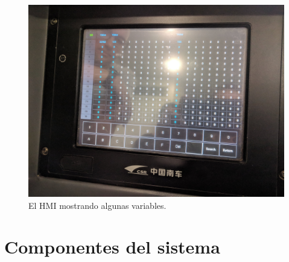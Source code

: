 \begin{figure}[htbp]
	\centering
	\includegraphics[width=1\textwidth]{./Figures/hmi.jpg}
	\caption[El HMI mostrando algunas variables]{El HMI mostrando algunas variables.}
    \label{fig:hmi}
\end{figure}



\section{Componentes del sistema}
